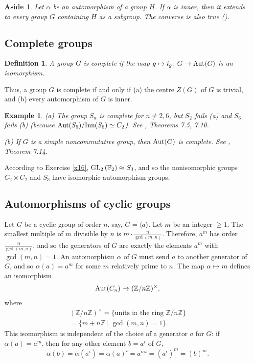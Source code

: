 \documentclass[a4paper,11pt,final,openany]{memoir}%
\newtheorem{definition}[X]{Definition}
\newtheorem{example}[X]{Example}
\newtheorem{aside}[X]{Aside}
\theoremstyle{nonumberplain}
\begin{document}
\begin{aside}
\label{it100b}Let $\alpha$ be an automorphism of a group $H$. If $\alpha$ is
inner, then it extends to every group $G$ containing $H$ as a subgroup. The
converse is also true (\cite{schupp1987}).
\end{aside}

\subsection{Complete groups}

\begin{definition}
\label{it00b}A group $G$ is \emph{complete\/}%
if the map $g\mapsto i_{g}\colon G\rightarrow\operatorname{Aut}(G)$ is an isomorphism.
\end{definition}

Thus, a group $G$ is complete if and only if (a) the centre $Z(G)$ of $G$ is
trivial, and (b) every automorphism of $G$ is inner.

\begin{example}
\label{it09} (a) The group $S_{n}$ is complete for $n\neq2,6$, but $S_{2}$
fails (a) and $S_{6}$ fails (b) (because $\operatorname{Aut}(S_{6})/\text{Inn}(S_{6})\simeq
C_{2}$). See \cite{rotman1995}, Theorems 7.5, 7.10.

(b) If $G$ is a simple noncommutative group, then $\operatorname{Aut}(G)$ is complete. See
\cite{rotman1995}, Theorem 7.14.
\end{example}

According to Exercise \ref{x16}, $\operatorname{GL}_{2}\left(  \mathbb{F}{}_{2}\right)
\approx S_{3}$, and so the nonisomorphic groups $C_{2}\times C_{2}$ and
$S_{3}$ have isomorphic automorphism groups.

\subsection{Automorphisms of cyclic groups}

Let $G$ be a cyclic group of order $n$, say, $G=\langle a\rangle$. Let $m$ be
an integer $\geq1$. The smallest multiple of $m$ divisible by $n$ is
$m\cdot\frac{n}{\gcd(m,n)}$. Therefore, $a^{m}$ has order $\frac{n}{\gcd
(m,n)}$, and so the generators of $G$ are exactly the elements $a^{m}$ with
$\gcd(m,n)=1$. An automorphism $\alpha$ of $G$ must send $a$ to another
generator of $G$, and so $\alpha(a)=a^{m}$ for some $m$ relatively prime to
$n$. The map $\alpha\mapsto m$ defines an isomorphism
\[
\operatorname{Aut}(C_{n})\rightarrow(\mathbb{Z}/n\mathbb{Z})^{\times},
\]
where
\begin{align*}
(\mathbb{Z}/n\mathbb{Z})^{\times}=\{\text{units in the ring }\mathbb{Z}%
/n\mathbb{Z}\}\\
=\{m+n\mathbb{Z}\mid\gcd(m,n)=1\}.
\end{align*}
This isomorphism is independent of the choice of a generator $a$ for $G$: if
$\alpha(a)=a^{m}$, then for any other element $b=a^{i}$ of $G$,
\[
\alpha(b)=\alpha(a^{i})=\alpha(a)^{i}=a^{mi}=(a^{i})^{m}=(b)^{m}.
\]
\end{document}
